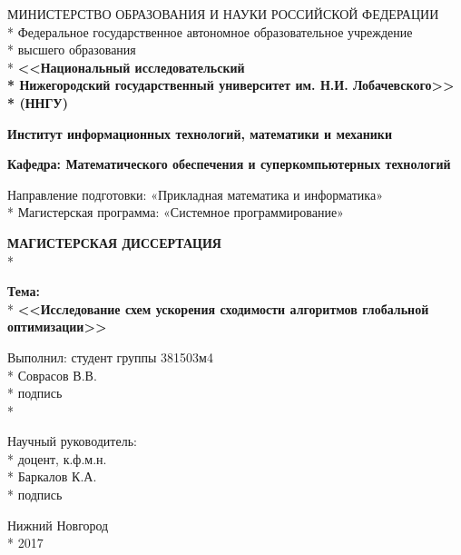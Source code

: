 \begin{titlepage}

\begin{center}
МИНИСТЕРСТВО ОБРАЗОВАНИЯ И НАУКИ РОССИЙСКОЙ ФЕДЕРАЦИИ \\*
Федеральное   государственное  автономное  образовательное  учреждение \\*
высшего образования \\*
\textbf{<<Национальный исследовательский \\*
Нижегородский государственный университет им. Н.И. Лобачевского>> \\*
(ННГУ)}
\end{center}

\vspace{12pt}

\begin{center}
\textbf{Институт информационных технологий, математики и механики}
\end{center}

\begin{center}
\textbf{Кафедра: Математического обеспечения и суперкомпьютерных технологий}
\end{center}

\vspace{25pt}
\begin{center}
Направление подготовки: «Прикладная математика и информатика» \\*
Магистерская программа: «Системное программирование»
\end{center}
\vspace{30pt}

\begin{center}
\fontsize{18pt}{0pt}\textbf{МАГИСТЕРСКАЯ ДИССЕРТАЦИЯ} \\*

\end{center}
\begin{center}
\textbf{Тема:} \\*
\fontsize{16pt}{0pt}\textbf{<<Исследование схем ускорения сходимости алгоритмов глобальной оптимизации>>}
\end{center}

\vspace{53pt}

\begin{flushright}
Выполнил: студент группы 381503м4 \\*
 Соврасов В.В. \\*
подпись  \\*

Научный руководитель:  \\*
доцент, к.ф.м.н.  \\*
 Баркалов К.А. \\*
подпись 
\end{flushright}

\vspace{\fill}

\begin{center}
Нижний Новгород \\*
2017
\end{center}

\end{titlepage}
